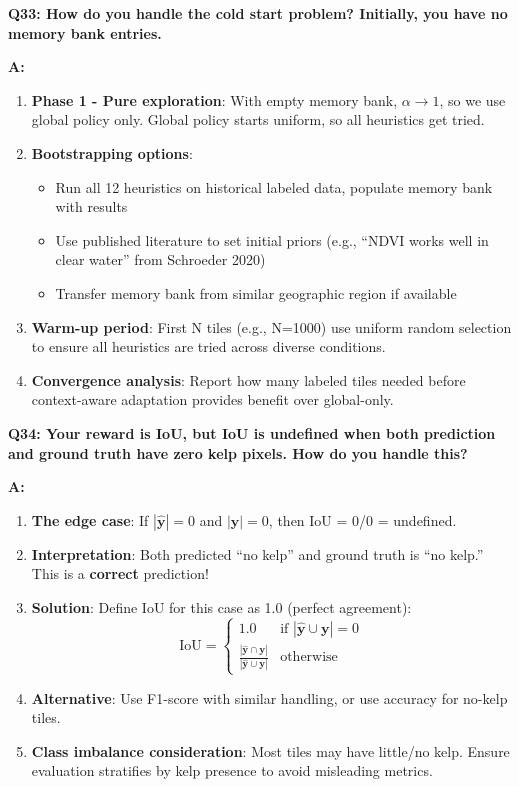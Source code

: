 \documentclass[11pt]{article}
\begin{document}
\textbf{Q33: How do you handle the cold start problem? Initially, you have no memory bank entries.}

\textbf{A:}

\begin{enumerate}
    \item \textbf{Phase 1 - Pure exploration}: With empty memory bank, $\alpha \to 1$, so we use global policy only. Global policy starts uniform, so all heuristics get tried.

    \item \textbf{Bootstrapping options}:
    \begin{itemize}
        \item Run all 12 heuristics on historical labeled data, populate memory bank with results
        \item Use published literature to set initial priors (e.g., ``NDVI works well in clear water'' from Schroeder 2020)
        \item Transfer memory bank from similar geographic region if available
    \end{itemize}

    \item \textbf{Warm-up period}: First N tiles (e.g., N=1000) use uniform random selection to ensure all heuristics are tried across diverse conditions.

    \item \textbf{Convergence analysis}: Report how many labeled tiles needed before context-aware adaptation provides benefit over global-only.
\end{enumerate}

\textbf{Q34: Your reward is IoU, but IoU is undefined when both prediction and ground truth have zero kelp pixels. How do you handle this?}

\textbf{A:}

\begin{enumerate}
    \item \textbf{The edge case}: If $|\hat{\mathbf{y}}| = 0$ and $|\mathbf{y}| = 0$, then IoU = 0/0 = undefined.

    \item \textbf{Interpretation}: Both predicted ``no kelp'' and ground truth is ``no kelp.'' This is a \textbf{correct} prediction!

    \item \textbf{Solution}: Define IoU for this case as 1.0 (perfect agreement):
    \[
    \text{IoU} = \begin{cases}
    1.0 & \text{if } |\hat{\mathbf{y}} \cup \mathbf{y}| = 0 \\
    \frac{|\hat{\mathbf{y}} \cap \mathbf{y}|}{|\hat{\mathbf{y}} \cup \mathbf{y}|} & \text{otherwise}
    \end{cases}
    \]

    \item \textbf{Alternative}: Use F1-score with similar handling, or use accuracy for no-kelp tiles.

    \item \textbf{Class imbalance consideration}: Most tiles may have little/no kelp. Ensure evaluation stratifies by kelp presence to avoid misleading metrics.
\end{enumerate}
\end{document}

